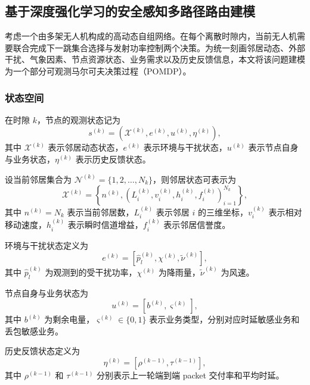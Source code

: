 \subsection{基于深度强化学习的安全感知多路径路由建模}

考虑一个由多架无人机构成的高动态自组网络。在每个离散时隙内，当前无人机需要联合完成下一跳集合选择与发射功率控制两个决策。为统一刻画邻居动态、外部干扰、气象因素、节点资源状态、业务需求以及历史反馈信息，本文将该问题建模为一个部分可观测马尔可夫决策过程（POMDP）。

\subsubsection{状态空间}

在时隙 $k$，节点的观测状态记为
\begin{equation}
s^{(k)}=
\left(
\mathcal{X}^{(k)},
e^{(k)},
u^{(k)},
\eta^{(k)}
\right),
\end{equation}
其中 $\mathcal{X}^{(k)}$ 表示邻居动态状态，$e^{(k)}$ 表示环境与干扰状态，$u^{(k)}$ 表示节点自身与业务状态，$\eta^{(k)}$ 表示历史反馈状态。

设当前邻居集合为 $\mathcal{N}^{(k)}=\{1,2,\dots,N_k\}$，则邻居状态可表示为
\begin{equation}
\mathcal{X}^{(k)}=
\left\{
n^{(k)},
\left(L_i^{(k)},v_i^{(k)},h_i^{(k)},f_i^{(k)}\right)_{i=1}^{N_k}
\right\},
\end{equation}
其中 $n^{(k)}=N_k$ 表示当前邻居数，$L_i^{(k)}$ 表示邻居 $i$ 的三维坐标，$v_i^{(k)}$ 表示相对移动速度，$h_i^{(k)}$ 表示瞬时信道增益，$f_i^{(k)}$ 表示邻居信誉度。

环境与干扰状态定义为
\begin{equation}
e^{(k)}=
\left[
\hat p_l^{(k)},\chi^{(k)},\tilde{\nu}^{(k)}
\right],
\end{equation}
其中 $\hat p_l^{(k)}$ 为观测到的受干扰功率，$\chi^{(k)}$ 为降雨量，$\tilde{\nu}^{(k)}$ 为风速。

节点自身与业务状态为
\begin{equation}
u^{(k)}=
\left[
b^{(k)},\varsigma^{(k)}
\right],
\end{equation}
其中 $b^{(k)}$ 为剩余电量，$\varsigma^{(k)}\in\{0,1\}$ 表示业务类型，分别对应时延敏感业务和丢包敏感业务。

历史反馈状态定义为
\begin{equation}
\eta^{(k)}=
\left[
\rho^{(k-1)},\tau^{(k-1)}
\right],
\end{equation}
其中 $\rho^{(k-1)}$ 和 $\tau^{(k-1)}$ 分别表示上一轮端到端 packet 交付率和平均时延。

